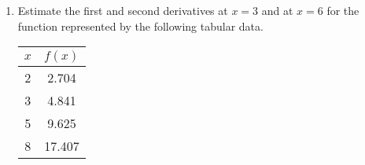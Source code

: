 \documentclass[12pt,class=book,crop=false]{standalone}
\begin{document}
\begin{enumerate}
    \item Estimate the first and second derivatives at $ x=3 $ and at $ x=6 $ for the function represented by the following tabular data.
          \begin{table}[H]
              \centering
              \begin{tabular}{cS[table-format=2.3]}
                  \toprule
                  $ x $    &
                   \\     &
                   2.704 \\
                    3     &
                    4.841 \\
                    5     &
                    9.625 \\
                    8      &
                    17.407 \\\bottomrule
              \end{tabular}
          \end{table}
\end{enumerate}
\end{document}
